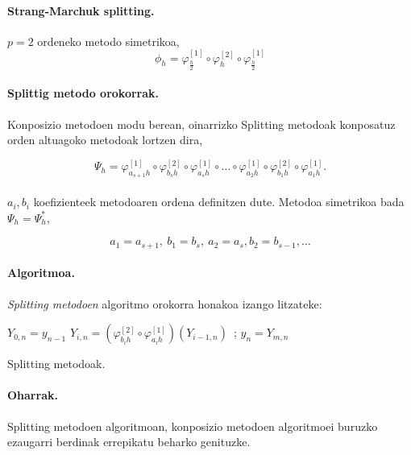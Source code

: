 \paragraph*{\textbf{Strang-Marchuk splitting}.}
$p=2$ ordeneko metodo simetrikoa,
\begin{equation}
\phi_h =  \varphi_{\frac{h}{2}}^{[1]} \circ \varphi_h^{[2]} \circ \varphi_{\frac{h}{2}}^{[1]}
\end{equation} 

\paragraph*{\textbf{Splittig metodo orokorrak}.}
Konposizio metodoen modu berean, oinarrizko Splitting metodoak konposatuz orden altuagoko metodoak lortzen dira, 

\begin{equation}
\Psi_h=\varphi^{[1]}_{a_{s+1} h} \circ \varphi^{[2]}_{b_s h} \circ \varphi^{[1]}_{a_s h} \circ \dots \circ \varphi^{[1]}_{a_2 h} \circ \varphi^{[2]}_{b_1 h} \circ \varphi^{[1]}_{a_1 h}.
\end{equation}

\paragraph*{} $a_i,b_i$ koefizienteek metodoaren ordena definitzen dute. Metodoa simetrikoa bada $\Psi_h=\Psi_h^{*}$,

\begin{equation*}
a_1=a_{s+1}, \ b_1=b_{s}, \ a_2=a_s, b_2=b_{s-1}, \dots
\end{equation*} 

\paragraph*{\textbf{Algoritmoa}.}
\emph{Splitting metodoen} algoritmo orokorra honakoa izango litzateke:

\begin{algorithm}[H]
 \BlankLine
  {
   \BlankLine
    $Y_{0,n}=y_{n-1} $\;
    \BlankLine
   {
    \BlankLine 
    $Y_{i,n}=(\varphi^{[2]}_{b_i h} \circ \varphi^{[1]}_{a_i h})(Y_{i-1,n})$\ ;
   }
   \BlankLine
    $y_{n}=Y_{m,n}$\;
   \BlankLine
 }
 \caption{Splitting metodoak.}
\end{algorithm}

\paragraph*{Oharrak.}
Splitting metodoen algoritmoan, konposizio metodoen algoritmoei buruzko ezaugarri berdinak errepikatu beharko genituzke. 

